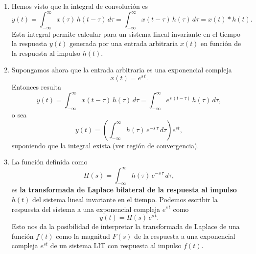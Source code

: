 \begin{enumerate}

\item Hemos visto que la integral de convoluci\'{o}n es 
\begin{equation}
        y\left( t\right) =
                \int_{-\infty }^{\infty }x\left( \tau \right) \, h\left(t-\tau \right) \, d\tau =
                \int_{-\infty }^{\infty }x\left( t-\tau \right) \, h\left( \tau \right) \, d\tau =
                x\left( t\right) * h\left( t\right) .
\end{equation}
Esta integral permite calcular para un sistema lineal invariante en el tiempo la respuesta 
$y\left( t\right) $ generada por una entrada arbitraria $x\left(t\right) $ en funci\'{o}n de la respuesta al impulso $h\left( t\right)$. 

\item Supongamos ahora que la entrada arbitraria es una exponencial compleja
\begin{equation}
        x\left( t\right) =e^{s \, t}.
\end{equation}
Entonces resulta 
\begin{equation}
        y\left( t\right) =
                \int_{-\infty }^{\infty }x\left( t-\tau \right) \, h\left(\tau \right) \, d\tau =
                \int_{-\infty }^{\infty }e^{s \, \left( t-\tau \right)} \, h\left( \tau \right) \, d\tau,
                \label{laplaceconv}
\end{equation}
o sea
\begin{equation}
        y\left( t\right) =
                \left( \int_{-\infty }^{\infty }h\left( \tau\right) \, e^{-s \, \tau } \, d\tau \right) e^{st},
\end{equation}
suponiendo que la integral exista (ver regi\'{o}n de convergencia).

\item La funci\'{o}n definida como 
\begin{equation}
        H\left( s\right) =
                \int_{-\infty }^{\infty }h\left( \tau \right) \, e^{-s \, \tau} \, d\tau ,
\end{equation}
es \textbf{la transformada de Laplace bilateral de la respuesta al impulso }$h\left(t\right) $ 
del sistema lineal invariante en el tiempo. 
Podemos escribir la respuesta del sistema a una exponencial compleja $e^{s \, t}$ como 
\begin{equation}
  y\left( t\right) = H\left( s\right) \, e^{s \, t}.
\end{equation}
 Esto nos da la posibilidad de interpretar la transformada de Laplace de una funci\'{o}n 
$f\left( t\right) $ como la magnitud $F\left(s\right) $ de la respuesta a una exponencial 
compleja $e^{st}$ de un sistema LIT con respuesta al impulso $f\left( t\right)$.


\end{enumerate}
